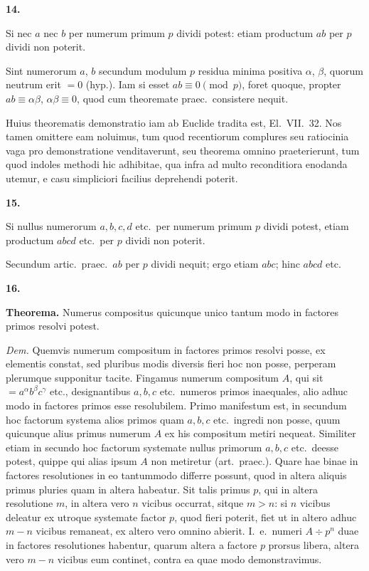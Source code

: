 \documentclass[12pt,a4paper]{article}
\theoremstyle{plain}
\theoremstyle{definition}
\theoremstyle{remark}
\begin{document}
\textbf{14.}

Si nec $a$ nec $b$ per numerum primum $p$ dividi potest: etiam productum $ab$ per $p$ dividi non poterit.

Sint numerorum $a$, $b$ secundum modulum $p$ residua minima positiva $\alpha$, $\beta$, quorum neutrum erit $= 0$ (hyp.). Iam si esset $ab \equiv 0 \pmod{p}$, foret quoque, propter $ab \equiv \alpha\beta$, $\alpha\beta \equiv 0$, quod cum theoremate praec.\ consistere nequit.

Huius theorematis demonstratio iam ab Euclide tradita est, El.~VII.~32. Nos tamen omittere eam noluimus, tum quod recentiorum complures seu ratiocinia vaga pro demonstratione venditaverunt, seu theorema omnino praeterierunt, tum quod indoles methodi hic adhibitae, qua infra ad multo reconditiora enodanda utemur, e casu simpliciori facilius deprehendi poterit.

\textbf{15.}

Si nullus numerorum $a, b, c, d$ etc.\ per numerum primum $p$ dividi potest, etiam productum $abcd$ etc.\ per $p$ dividi non poterit.

Secundum artic.\ praec.\ $ab$ per $p$ dividi nequit; ergo etiam $abc$; hinc $abcd$ etc.

\textbf{16.}

\textbf{Theorema.} Numerus compositus quicunque unico tantum modo in factores primos resolvi potest.

\textit{Dem.} Quemvis numerum compositum in factores primos resolvi posse, ex elementis constat, sed pluribus modis diversis fieri hoc non posse, perperam plerumque supponitur tacite. Fingamus numerum compositum $A$, qui sit $= a^\alpha b^\beta c^\gamma$ etc., designantibus $a, b, c$ etc.\ numeros primos inaequales, alio adhuc modo in factores primos esse resolubilem. Primo manifestum est, in secundum hoc factorum systema alios primos quam $a, b, c$ etc.\ ingredi non posse, quum quicunque alius primus numerum $A$ ex his compositum metiri nequeat. Similiter etiam in secundo hoc factorum systemate nullus primorum $a, b, c$ etc.\ deesse potest, quippe qui alias ipsum $A$ non metiretur (art.~praec.). Quare hae binae in factores resolutiones in eo tantummodo differre possunt, quod in altera aliquis primus pluries quam in altera habeatur. Sit talis primus $p$, qui in altera resolutione $m$, in altera vero $n$ vicibus occurrat, sitque $m > n$: si $n$ vicibus deleatur ex utroque systemate factor $p$, quod fieri poterit, fiet ut in altero adhuc $m - n$ vicibus remaneat, ex altero vero omnino abierit. I.~e.\ numeri $A \div p^n$ duae in factores resolutiones habentur, quarum altera a factore $p$ prorsus libera, altera vero $m - n$ vicibus eum continet, contra ea quae modo demonstravimus.
\end{document}
